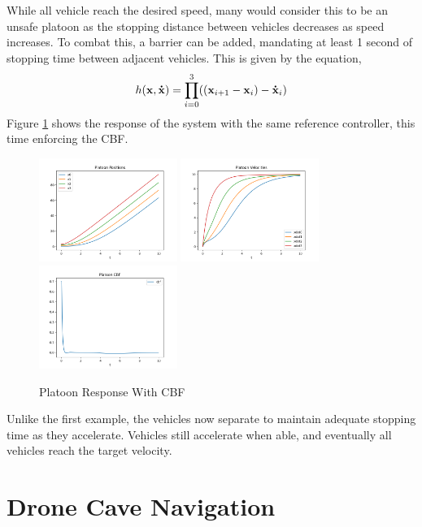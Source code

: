 \noindent While all vehicle reach the desired speed, many would consider this to be an unsafe platoon as the stopping distance between vehicles decreases as speed increases. To combat this, a barrier can be added, mandating at least 1 second of stopping time between adjacent vehicles. This is given by the equation,
\begin{align*}
    h({\mathbf{{x}}}, {\mathbf{\dot{x}}}) = \prod_{i = 0}^3 (({\mathbf{{x}}}_{i + 1} - {\mathbf{{x}}}_i) -  {\mathbf{\dot{x}}}_i)
\end{align*}
\noindent Figure \ref{fig:platoon_cbf} shows the response of the system with the same reference controller, this time enforcing the CBF.
\begin{figure}[H]
    \centering
    \includegraphics[width=0.4\textwidth]{Figures/Examples/Platoon/Positions.png}
    \includegraphics[width=0.4\textwidth]{Figures/Examples/Platoon/Velocities.png}
    \includegraphics[width=0.4\textwidth]{Figures/Examples/Platoon/CBF.png}
    \caption{Platoon Response With CBF}
    \label{fig:platoon_cbf}
\end{figure}
\noindent Unlike the first example, the vehicles now separate to maintain adequate stopping time as they accelerate. Vehicles still accelerate when able, and eventually all vehicles reach the target velocity.
\section{Drone Cave Navigation}  \label{sec:drone}

